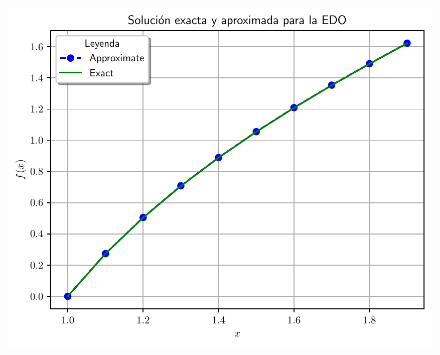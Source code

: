 \begin{frame}
    \begin{solution}
        \begin{figure}[ht!]
            \centering
            \includegraphics[width=0.65\paperwidth]{p3}
        \end{figure}
    \end{solution}
\end{frame}